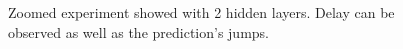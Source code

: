 \begin{figure}[H]
	\begin{center}
	\end{center}
	\caption{Zoomed experiment showed with 2 hidden layers. Delay can be observed as well as the prediction's jumps.}

	\label{fig:nn_raw_2_hidden_512_400_40_1_1000_7000_10000}
\end{figure}

